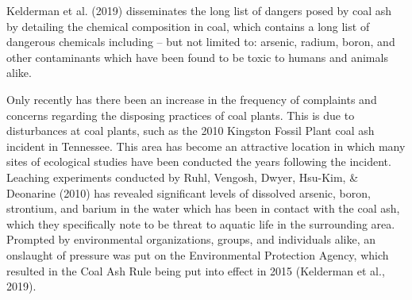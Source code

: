 \documentclass[12pt, twoside]{amherstthesis}
\begin{document}
Kelderman et al. (2019) disseminates the long list of dangers posed by coal ash by detailing the chemical composition in coal, which contains a long list of dangerous chemicals including -- but not limited to: arsenic, radium, boron, and other contaminants which have been found to be toxic to humans and animals alike.

Only recently has there been an increase in the frequency of complaints and concerns regarding the disposing practices of coal plants. This is due to disturbances at coal plants, such as the 2010 Kingston Fossil Plant coal ash incident in Tennessee. This area has become an attractive location in which many sites of ecological studies have been conducted the years following the incident. Leaching experiments conducted by Ruhl, Vengosh, Dwyer, Hsu-Kim, \& Deonarine (2010) has revealed significant levels of dissolved arsenic, boron, strontium, and barium in the water which has been in contact with the coal ash, which they specifically note to be threat to aquatic life in the surrounding area. Prompted by environmental organizations, groups, and individuals alike, an onslaught of pressure was put on the Environmental Protection Agency, which resulted in the Coal Ash Rule being put into effect in 2015 (Kelderman et al., 2019).
\end{document}
